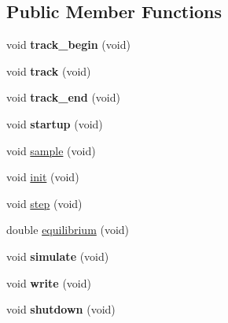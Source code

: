 \subsection*{Public Member Functions}
\begin{DoxyCompactItemize}
\item 
\hypertarget{classIOSKJ_1_1Model_ae261a53c42f71d17182c1b129698126d}{void {\bfseries track\-\_\-begin} (void)}\label{classIOSKJ_1_1Model_ae261a53c42f71d17182c1b129698126d}

\item 
\hypertarget{classIOSKJ_1_1Model_af18a3687dd2685745174b91e0aae56ce}{void {\bfseries track} (void)}\label{classIOSKJ_1_1Model_af18a3687dd2685745174b91e0aae56ce}

\item 
\hypertarget{classIOSKJ_1_1Model_a03e6aeb637c83c34774ac66c18bac74d}{void {\bfseries track\-\_\-end} (void)}\label{classIOSKJ_1_1Model_a03e6aeb637c83c34774ac66c18bac74d}

\item 
\hypertarget{classIOSKJ_1_1Model_a6f42bfc7352faa7bba7e00d04fc166b0}{void {\bfseries startup} (void)}\label{classIOSKJ_1_1Model_a6f42bfc7352faa7bba7e00d04fc166b0}

\item 
void \hyperlink{classIOSKJ_1_1Model_a242ba7c47871099bf4bed482d262cede}{sample} (void)
\item 
void \hyperlink{classIOSKJ_1_1Model_af64274ff5991d11e1c232618af8de800}{init} (void)
\item 
void \hyperlink{classIOSKJ_1_1Model_af163ebda22001c7df308dc227c1687bb}{step} (void)
\item 
double \hyperlink{classIOSKJ_1_1Model_aa422925a07c078b87c5727a6a7c22d00}{equilibrium} (void)
\item 
\hypertarget{classIOSKJ_1_1Model_abf9ebdb10aee501808836438cb542fab}{void {\bfseries simulate} (void)}\label{classIOSKJ_1_1Model_abf9ebdb10aee501808836438cb542fab}

\item 
\hypertarget{classIOSKJ_1_1Model_abfc09c1b2d6bfe2802835cd5fd58c3b3}{void {\bfseries write} (void)}\label{classIOSKJ_1_1Model_abfc09c1b2d6bfe2802835cd5fd58c3b3}

\item 
\hypertarget{classIOSKJ_1_1Model_a343216d7c9019f15f01f205423001005}{void {\bfseries shutdown} (void)}\label{classIOSKJ_1_1Model_a343216d7c9019f15f01f205423001005}

\end{DoxyCompactItemize}

